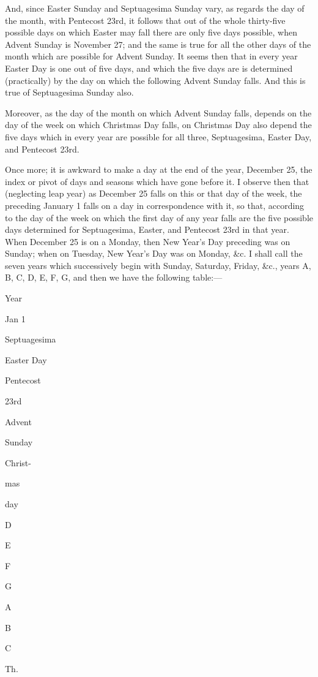 And, since Easter Sunday and
Septuagesima Sunday vary, as regards the day of the month, with
Pentecost 23rd, it follows that out of the whole thirty-five possible
days on which Easter may fall there are only five days possible, when
Advent Sunday is November 27; and the same is true for all the other
days of the month which are possible for Advent Sunday. It seems then
that in every year Easter Day is one out of five days, and which the
five days are is determined (practically) by the day on which the
following Advent Sunday falls. And this is true of Septuagesima Sunday
also.

Moreover, as the day of the
month on which Advent Sunday falls, depends on the day of the week on
which Christmas Day falls, on Christmas Day also depend the five
days which in every year are possible for all three, Septuagesima,
Easter Day, and Pentecost 23rd.

Once more; it is awkward to
make a day at the end of the year, December 25, the index or pivot of
days and seasons which have gone before it. I observe then that
(neglecting leap year) as December 25 falls on this or that day of the
week, the preceding January 1 falls on a day in correspondence with
it, so that, according to the day of the week on which the first day
of any year falls are the five possible days determined for
Septuagesima, Easter, and Pentecost 23rd in that year. When December
25 is on a Monday, then New Year's Day preceding was on Sunday; when
on Tuesday, New Year's Day was on Monday, \&c. I shall call the
seven years which successively begin with Sunday, Saturday, Friday,
\&c., years A, B, C, D, E, F, G, and then we have the following
table:—

Year

Jan
1

Septuagesima

Easter
Day

Pentecost

23rd

Advent

Sunday

Christ-

mas

day

D

E

F

G

A

B

C

Th.

